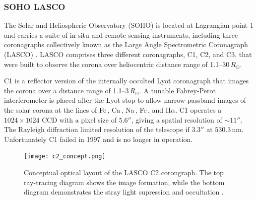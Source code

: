 \subsubsection{SOHO LASCO}\label{sec:23}

The Solar and Heliospheric Observatory (SOHO) is located at Lagrangian point 1 and carries a suite of in-situ and remote sensing instruments, including three coronagraphs collectively known as the Large Angle Spectrometric Coronagraph (LASCO) \citep{bru95}. LASCO comprises three different coronagraphs, C1, C2, and C3, that were built to observe the corona over heliocentric distance range of 1.1--30\,$R_{\odot}$. 

C1 is a reflector version of the internally occulted Lyot coronagraph that images the corona over a distance range of 1.1--3\,$R_{\odot}$. A tunable Fabrey-Perot interferometer is placed after the Lyot stop to allow narrow passband images of the solar corona at the lines of Fe\,, Ca\,, Na\,, Fe\,, and H$\alpha$.
C1 operates a $1024\times1024$ CCD with a pixel size of $5.6''$, giving a spatial resolution of $\sim11''$. The Rayleigh diffraction limited resolution of the telescope if $3.3''$ at $530.3$\,nm. Unfortunately C1 failed in 1997 and is no longer in operation. 
\begin{figure}[!t]
\begin{center}
\texttt{[image: c2\_concept.png]}
\caption[The LASCO C2 coronagraph optics]{Conceptual optical layout of the LASCO C2 corongraph. The top ray-tracing diagram shows the image formation, while the bottom diagram demonstrates the stray light supression and occultation \citep{bru95}.}
\label{fig:c2_concept}
\end{center}
\end{figure}


